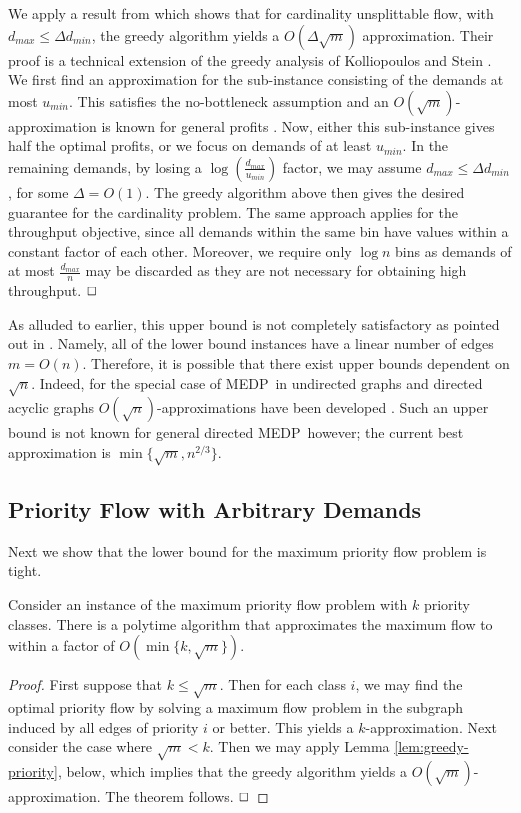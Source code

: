 \documentclass[12pt]{article}
\newcommand{\qed}{$\hfill{\Box}$}
\newcommand{\medp}{{\sc MEDP}}
\begin{document}
We apply a result from \cite{guruswami2003near} which shows that for cardinality
unsplittable flow, with $d_{max} \leq \Delta d_{min}$,
the greedy algorithm yields a $O(\Delta \sqrt{m})$ approximation.  Their proof is a technical extension
of the greedy analysis of Kolliopoulos and Stein \cite{kolliopoulos2004approximating}.
We first find an approximation for the sub-instance consisting of the demands at most $u_{min}$. This
satisfies the no-bottleneck assumption and an $O(\sqrt{m})$-approximation is known for general profits \cite{baveja2000approximation}.
Now, either this sub-instance gives half the optimal profits, or we focus on demands of at least $u_{min}$.
In the remaining demands, by losing a $\log (\frac{d_{max}}{u_{min}})$ factor, we may assume $d_{max} \leq \Delta d_{min}$, for some $\Delta=O(1)$.
The greedy algorithm above then gives the desired guarantee for the cardinality problem.
The same approach applies for the throughput objective, since all demands within the same bin
have values within a constant factor of each other. Moreover, we require only $\log n$ bins
as demands of  at most $\frac{d_{max}}{n}$ may be discarded as they are not necessary for
obtaining high throughput.
\qed








\vspace*{.3cm}
As alluded to earlier, this  upper bound  is not completely satisfactory as pointed out in \cite{chekuri2003edge}. Namely,
all of the lower bound instances have a linear number of edges $m=O(n)$.
Therefore, it is possible that there exist upper bounds dependent on $\sqrt{n}$.
Indeed, for the special case of \medp \ in undirected graphs and directed acyclic graphs
$O(\sqrt{n})$-approximations have been developed  \cite{chekuri2006n,nguyen2007disjoint}.
Such an upper bound is
not known for general directed \medp \ however;
the current best approximation is $\min\{\sqrt{m},n^{2/3}\}$.



\subsection{Priority Flow with Arbitrary Demands}\label{sec:upper-priority}
Next we show that the lower bound for the maximum priority flow problem is tight.
\begin{thm}
Consider an instance of the maximum priority flow problem with $k$ priority classes.
There is a polytime algorithm that approximates the maximum flow to within a factor of $O(\min\{k,\sqrt{m}\})$.
\end{thm}
\begin{proof}
 First suppose that $k \leq \sqrt{m}$. Then for each class $i$,
we may find the optimal priority flow by solving a maximum flow problem in the subgraph induced by all edges of
priority $i$ or better. This yields a $k$-approximation.
Next consider the case where $\sqrt{m} < k$. Then we may apply Lemma \ref{lem:greedy-priority}, below,
which implies that the greedy algorithm yields
a $O(\sqrt{m})$-approximation. The theorem follows.
\qed
\end{proof}
\end{document}
